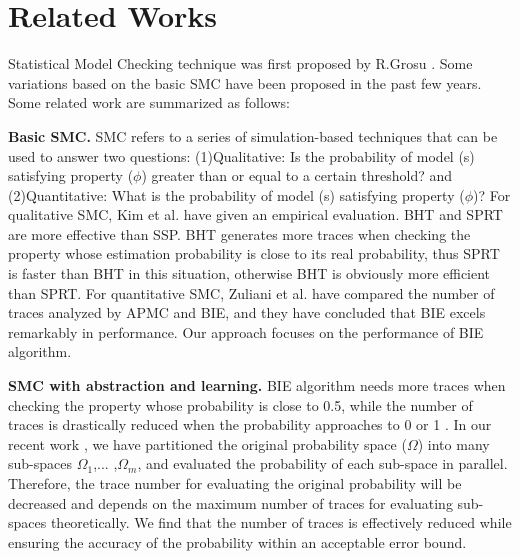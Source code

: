\section{Related Works}
Statistical Model Checking technique was first proposed by R.Grosu \cite{grosu2005monte}. Some variations \cite{legay2010statistical} \cite{Younes2004Planning} \cite{younes2006statistical}\cite{jha2009bayesian} \cite{zuliani2013bayesian} \cite{herault2004} based on the basic SMC have been proposed in the past few years. Some related work are summarized as follows:

\textbf{Basic SMC.}
SMC refers to a series of simulation-based techniques that can be used to answer two questions: (1)Qualitative: Is the probability of model (s) satisfying property ($\phi$) greater than or equal to a certain threshold? and (2)Quantitative: What is the probability of model (s) satisfying property ($\phi$)? For qualitative SMC, Kim et al. \cite{kim2012statistical} have given an empirical evaluation. BHT and SPRT are more effective than SSP. BHT generates more traces when checking the property whose estimation probability is close to its real probability, thus SPRT is faster than BHT in this situation, otherwise BHT is obviously more efficient than SPRT. For quantitative SMC, Zuliani et al. \cite{zuliani2013bayesian} have compared the number of traces analyzed by APMC and BIE, and they have concluded that BIE excels remarkably in performance. Our approach focuses on the performance of BIE algorithm.

\textbf{SMC with abstraction and learning.}
BIE algorithm needs more traces when checking the property whose probability is close to 0.5, while the number of traces is drastically reduced when the probability approaches to 0 or 1 \cite{zuliani2013bayesian}. In our recent work \cite{jiangkaiqiang2016}, we have partitioned the original probability space ($\Omega$) into many sub-spaces $\Omega_1$,... ,$\Omega_m$, and evaluated the probability of each sub-space in parallel. Therefore, the trace number for evaluating the original probability will be decreased and depends on the maximum number of traces for evaluating sub-spaces theoretically. We find that the number of traces is effectively reduced while ensuring the accuracy of the probability within an acceptable error bound.

